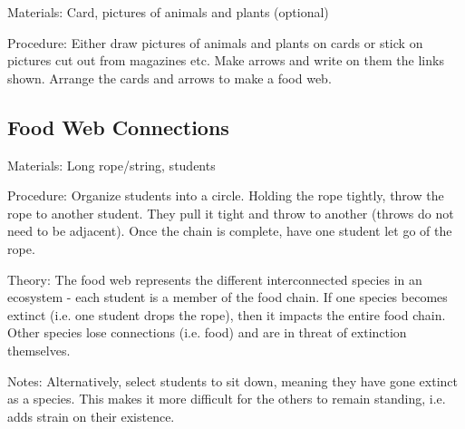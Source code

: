 \begin{multicols}{2}
\begin{description*}
\item[Materials:]{Card, pictures of animals and plants (optional)}
\item[Procedure:]{Either draw pictures of animals
and plants on cards or stick on
pictures cut out from magazines
etc. Make arrows and write on
them the links shown. Arrange
the cards and arrows to make a
food web.}
\end{description*}

\columnbreak

\subsection{Food Web Connections} %


\begin{description*}
\item[Materials:]{Long rope/string, students}
\item[Procedure:]{Organize students into a circle. Holding the rope tightly, throw the rope to another student. They pull it tight and throw to another (throws do not need to be adjacent). Once the chain is complete, have one student let go of the rope.}
\item[Theory:]{The food web represents the different interconnected species in an ecosystem - each student is a member of the food chain. If one species becomes extinct (i.e. one student drops the rope), then it impacts the entire food chain. Other species lose connections (i.e. food) and are in threat of extinction themselves.}
\item[Notes:]{Alternatively, select students to sit down, meaning they have gone extinct as a species. This makes it more difficult for the others to remain standing, i.e. adds strain on their existence.}
\end{description*}



\end{multicols}

\pagebreak